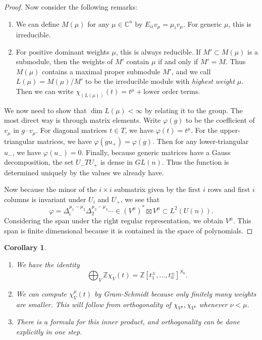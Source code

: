 \documentclass[leqno, openany]{memoir}
\newtheorem{cor}[thm]{Corollary}
\theoremstyle{definition}
\theoremstyle{remark}
\theoremstyle{plain}
\theoremstyle{definition}
\theoremstyle{remark}
\newcommand{\C}{\mathbb{C}}
\newcommand{\Z}{\mathbb{Z}}
\begin{document}
\begin{proof}
    Now consider the following remarks:
    \begin{enumerate}
        \item We can define $M(\mu)$ for any $\mu \in \C^n$ by $E_{ii} v_{\mu} = \mu_i v_{\mu}$. For generic $\mu$, this is irreducible.
        \item For positive dominant weights $\mu$, this is always reducible. If $M' \subset M(\mu)$ is a submodule, then the weights of $M'$ contain $\mu$ if and only if $M' = M$. Thus $M(\mu)$ contains a maximal proper submodule $M'$, and we call $L(\mu) = M(\mu) / M'$ to be the irreducible module with \textit{highest weight}  $\mu$. Then we can write $\chi_{(L(\mu))}(t) = t^{\mu} + \text{lower order terms}$.
    \end{enumerate}
    We now need to show that $\dim L(\mu) < \infty$ by relating it to the group. The most direct way is through matrix elements. Write $\varphi(g)$ to be the coefficient of $v_{\mu}$ in $g \cdot v_{\mu}$. For diagonal matrices $t \in T$, we have $\varphi(t) = t^{\mu}$. For the upper-triangular matrices, we have $\varphi(gu_+) = \varphi(g)$. Then for any lower-triangular $u_-$, we have $\varphi(u_-) = 0$. Finally, because generic matrices have a Gauss decomposition, the set $U_- T U_+$ is dense in $GL(n)$. Thus the function is determined uniquely by the values we already have.

    Now because the minor of the $i \times i$ submatrix given by the first $i$ rows and first $i$ columns is invariant under $U_i$ and $U_+$, we see that 
    \[ \varphi = \Delta_i^{\mu_1 - \mu_2} \Delta_2^{\mu_2 - \mu_3} \cdots \in (V^{\mu})^* \boxtimes V^{\mu} \subset L^2(U(n)). \]
    Considering the span under the right regular representation, we obtain $V^{\mu}$. This span is finite dimensional because it is contained in the space of polynomials.
\end{proof}

\begin{cor}
    \begin{enumerate}
        \item We have the identity
            \[ \bigoplus_V \Z \chi_V(t) = {\Z[t_1^{\pm}, \ldots, t_n^{\pm}]}^{S_n}. \]
        \item We can compute $\chi_V^{\mu}(t)$ by Gram-Schmidt because only finitely many weights are smaller. This will follow from orthogonality of $\chi_{V^{\mu}}, \chi_{V^{\nu}}$ whenever $\nu < \mu$.
        \item There is a formula for this inner product, and orthogonality can be done explicitly in one step.
    \end{enumerate}
\end{cor}
\end{document}
